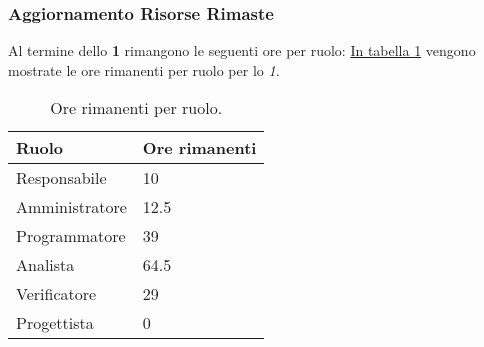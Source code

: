 \subsubsection{Aggiornamento Risorse Rimaste}
\label{sec:AggiornamentoRisorse_Sprint1}
Al termine dello \textbf{ 1} rimangono le seguenti ore per ruolo: \hyperref[tab:sprint1_ore_rimanenti]{In tabella \ref{tab:sprint1_ore_rimanenti}} vengono mostrate le ore rimanenti per ruolo per lo \textit{ 1}.

\begin{table}[H]
    \centering
    \begin{tabular}{| l | l |}
    \hline
    \textbf{Ruolo} & 
    \textbf{Ore rimanenti}\\
    \hline
        Responsabile & 10\\
    \hline
        Amministratore & 12.5\\
    \hline
        Programmatore & 39\\
    \hline
        Analista & 64.5 \\
    \hline
        Verificatore & 29 \\
    \hline
        Progettista & 0 \\
    \hline
    \end{tabular}
    \caption{Ore rimanenti per ruolo.}
    \label{tab:sprint1_ore_rimanenti} 
\end{table}
